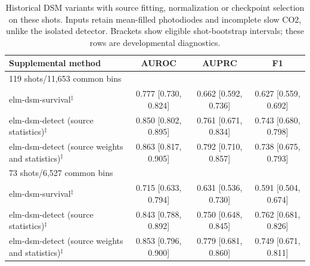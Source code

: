 \begin{table}[t]
\centering
\small
\begin{tabular}{lccc}
\toprule
Supplemental method & AUROC & AUPRC & F1 \\
\midrule
\multicolumn{4}{l}{119 shots/11,653 common bins} \\
elm-dsm-survival$^{\ddagger}$ & 0.777 {\scriptsize[0.730, 0.824]} & 0.662 {\scriptsize[0.592, 0.736]} & 0.627 {\scriptsize[0.559, 0.692]} \\
elm-dsm-detect (source statistics)$^{\ddagger}$ & 0.850 {\scriptsize[0.802, 0.895]} & 0.761 {\scriptsize[0.671, 0.834]} & 0.743 {\scriptsize[0.680, 0.798]} \\
elm-dsm-detect (source weights and statistics)$^{\ddagger}$ & 0.863 {\scriptsize[0.817, 0.905]} & 0.792 {\scriptsize[0.710, 0.857]} & 0.738 {\scriptsize[0.675, 0.793]} \\
\midrule
\multicolumn{4}{l}{73 shots/6,527 common bins} \\
elm-dsm-survival$^{\ddagger}$ & 0.715 {\scriptsize[0.633, 0.794]} & 0.631 {\scriptsize[0.536, 0.730]} & 0.591 {\scriptsize[0.504, 0.674]} \\
elm-dsm-detect (source statistics)$^{\ddagger}$ & 0.843 {\scriptsize[0.788, 0.892]} & 0.750 {\scriptsize[0.648, 0.845]} & 0.762 {\scriptsize[0.681, 0.826]} \\
elm-dsm-detect (source weights and statistics)$^{\ddagger}$ & 0.853 {\scriptsize[0.796, 0.900]} & 0.779 {\scriptsize[0.681, 0.860]} & 0.749 {\scriptsize[0.671, 0.811]} \\
\bottomrule
\end{tabular}\caption{Historical DSM variants with source fitting, normalization or checkpoint selection on these shots. Inputs retain mean-filled photodiodes and incomplete slow CO2, unlike the isolated detector. Brackets show eligible shot-bootstrap intervals; these rows are developmental diagnostics.}
\label{tab:elm-supplemental}
\end{table}
